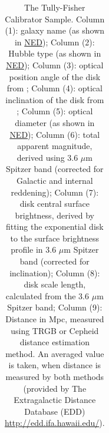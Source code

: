 \documentclass[usenatbib,useAMS]{mnras}
\begin{document}
\begin{table}
\begin{tabular}{llrlllllrl}
% 
\end{tabular}
\caption{The Tully-Fisher Calibrator Sample.
Column (1): galaxy name (as shown in \href{https://ned.ipac.caltech.edu/forms/byname.html}{NED});
Column (2): Hubble type (as shown in \href{https://ned.ipac.caltech.edu/forms/byname.html}{NED});
Column (3): optical position angle of the disk from ;
Column (4): optical inclination of the disk from ;
Column (5): optical diameter (as shown in \href{https://ned.ipac.caltech.edu/forms/byname.html}{NED});
Column (6): total apparent magnitude, derived using 3.6 $\mu$m Spitzer band (corrected for Galactic and internal reddening);
Column (7): disk central surface brightness, derived by fitting the exponential disk to the surface brightness profile in 3.6 $\mu$m Spitzer band (corrected for inclination);
Column (8): disk scale length, calculated from the 3.6 $\mu$m Spitzer band;
Column (9): Distance in Mpc, measured using TRGB or Cepheid distance estimation method. An averaged value is taken, when distance is measured by both methods (provided by The Extragalactic Distance Database (EDD) \href{http://edd.ifa.hawaii.edu/}{http://edd.ifa.hawaii.edu/}).
}
\label{tbl_samp}
\end{table}
\end{document}

